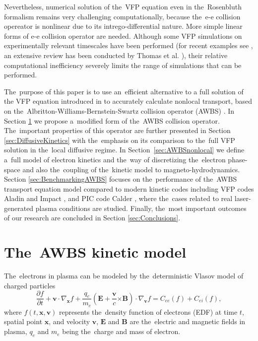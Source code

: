 \documentclass[
 aps,
 jmp,
 amsmath,amssymb,
 twocolumn,
]{revtex4-1}
\newcommand{\secref}[1]{Section~\ref{#1}}
\newcommand{\pdv}[2]{\frac{\partial{#1}}{\partial{#2}}}
\newcommand{\vect}[1]{\boldsymbol{#1}}
\newcommand{\E}{\vect{E}}
\newcommand{\B}{\vect{B}}
\newcommand{\qe}{q_e}
\newcommand{\me}{m_e}
\newcommand{\vv}{\vect{v}}
\newcommand{\gv}{\nabla_{\vv}}
\newcommand{\gx}{\nabla_{\vect{x}}}
\newcommand{\ft}{f}
\begin{document}
Nevertheless, numerical solution of the~VFP equation even in the~Rosenbluth
formalism remains very challenging computationally, because the~e-e collision
opereator is nonlinear due to its intrego-differential nature. 
More simple linear forms of e-e collision operator
are needed. Although some VFP simulations on experimentally relevant timescales 
have been performed (for recent examples see 
\cite{Hawreliak04,Ridgers08,Willingale10,Bissell10,Joglekar14,Joglekar16,Henchen_PRL2018}, 
an extensive review has been conducted by Thomas et al. \cite{Thomas13}), 
their relative computational inefficiency severely limits the range of 
simulations that can be performed.

The~purpose of this paper is to use an~efficient alternative 
to a full solution of the VFP equation introduced in \cite{Sorbo_2015}
to accurately calculate nonlocal transport, 
based on the~Albritton-Williams-Bernstein-Swartz 
collision operator (AWBS) \cite{AWBS_PRL1986}.
In Section \ref{sec:AWBSmodel} we propose a~modified form of 
the~AWBS collision operator. The~important properties of this operator 
are further presented in Section \ref{sec:DiffusiveKinetics} 
with the~emphasis on its
comparison to the~full VFP solution in the~local diffusive regime.
In \secref{sec:AWBSnonlocal} we define a~full model of electron kinetics and 
the~way of discretizing the~electron phase-space and also
the~coupling of the~kinetic model to magneto-hydrodynamics.
Section \ref{sec:BenchmarkingAWBS} focuses on the~performance of the~AWBS 
transport equation model compared to modern kinetic codes including VFP codes
Aladin and Impact \cite{Kingham_JCP2004}, and PIC code Calder 
\cite{Perez_PoP2012}, where the~cases related to real
laser-generated plasma conditions are studied. Finally, the~most important
outcomes of our research are concluded in Section \ref{sec:Conclusions}.

\section{The~AWBS kinetic model}
\label{sec:AWBSmodel}

The~electrons in plasma can be modeled by the~deterministic Vlasov model 
of charged particles
\begin{equation}
  \pdv{\ft}{t} + \vv\cdot\gx \ft + 
  \frac{\qe}{\me}\left(\E + \frac{\vv}{c}\vect{\times}\B\right)\cdot\gv \ft = 
  C_{ee}(\ft) + C_{ei}(\ft) ,
  \label{eq:kinetic_equation}
\end{equation}
where $\ft(t, \vect{x}, \vect{v})$ represents 
the~density function of electrons (EDF)
at time $t$, spatial point $\vect{x}$, and velocity $\vv$, $\E$ and $\B$ are 
the~electric and magnetic fields in plasma, $\qe$ and $\me$ being 
the~charge and mass of electron.
\end{document}
